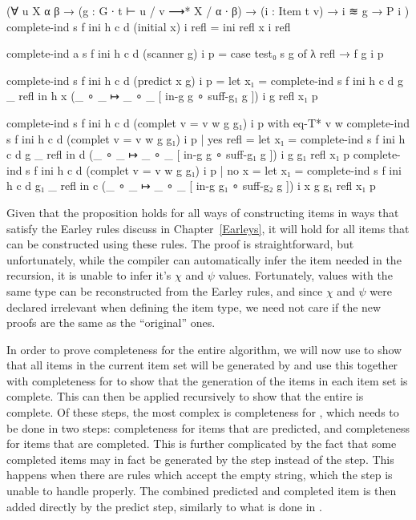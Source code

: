 		\begin{code}
			    (∀ {u X α β} →
			      (g : G ∙ t ⊢ u / v ⟶* X / α ∙ β) →
			      (i : Item t v) →
			      i ≋ g →
			      P i
			    )
			  complete-ind s f ini h c d (initial x) i refl =
			    ini refl x i refl
			
			  complete-ind {a} s f ini h c d (scanner g) i p =
			    case test₀ s g of λ {refl → f g i p}
			
			  complete-ind s f ini h c d (predict x g) i p =
			    let x₁ = complete-ind s f ini h c d g _ refl in
			    h x (_ ∘ _ ↦ _ ∘ _ [ in-g g ∘ suff-g₁ g ]) i g refl x₁ p
			
			  complete-ind s f ini h c d (complet {v = v} {w} g g₁) i p with eq-T* v w
			  complete-ind s f ini h c d (complet {v = v} {w} g g₁) i p | yes refl =
			    let x₁ = complete-ind s f ini h c d g _ refl in
			    d (_ ∘ _ ↦ _ ∘ _ [ in-g g ∘ suff-g₁ g ]) i g g₁ refl x₁ p
			  complete-ind s f ini h c d (complet {v = v} {w} g g₁) i p | no x =
			    let x₁ = complete-ind s f ini h c d g₁ _ refl in
			    c (_ ∘ _ ↦ _ ∘ _ [ in-g g₁ ∘ suff-g₂ g ]) i x g g₁ refl x₁ p
		\end{code}

		Given that the proposition holds for all ways of constructing items in
		ways that satisfy the Earley rules discuss in Chapter~\ref{Earleys}, it
		will hold for all items that can be constructed using these rules. The
		proof is straightforward, but unfortunately, while the compiler can
		automatically infer the item needed in the recursion, it is unable to
		infer it's $\chi$ and $\psi$ values. Fortunately, values with the same
		type can be reconstructed from the Earley rules, and since $\chi$ and
		$\psi$ were declared irrelevant when defining the item type, we need
		not care if the new proofs are the same as the ``original'' ones.

		In order to prove completeness for the entire algorithm, we will now
		use  to show that all items in the current item
		set will be generated by  and use this together with
		completeness for  to show that the generation of the items
		in each item set is complete. This can then be applied recursively to
		show that the entire  is complete. Of these steps, the
		most complex is completeness for , which needs to be
		done in two steps: completeness for items that are predicted, and
		completeness for items that are completed. This is further complicated
		by the fact that some completed items may in fact be generated by the
		 step instead of the  step. This happens
		when there are rules which accept the empty string, which the
		 step is unable to handle properly. The combined
		predicted and completed item is then added directly by the predict
		step, similarly to what is done in \cite{aycock02}.

